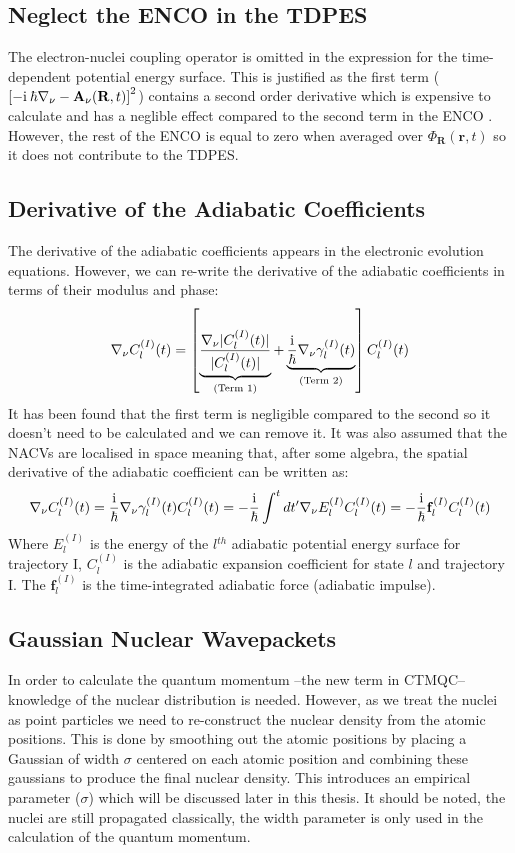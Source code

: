 \subsection{Neglect the ENCO in the TDPES}
The electron-nuclei coupling operator is omitted in the expression for the time-dependent potential energy surface. This is justified as the first term ($\left[-\mathrm{i} \: \hbar \nabla_{\nu} - \mathbf{A}_{\nu}(\mathbf{R}, t) \right]^2$) contains a second order derivative which is expensive to calculate and has a neglible effect compared to the second term in the ENCO \cite{Scherrer2015Aug}. However, the rest of the ENCO is equal to zero when averaged over $\Phi_{\mathbf{R}}(\mathbf{r},t)$ so it does not contribute to the TDPES.
\subsection{Derivative of the Adiabatic Coefficients}
The derivative of the adiabatic coefficients appears in the electronic evolution equations. However, we can re-write the derivative of the adiabatic coefficients in terms of their modulus and phase:
\begin{equation}
	\nabla_{\nu} C_{l}^{(I)}(t) = \left[ \underbrace{\frac{\nabla_{\nu} |C_{l}^{(I)}(t)|}{|C_{l}^{(I)}(t)|}}_{(\text{Term 1})} + \underbrace{\frac{\mathrm{i}}{\hbar} \nabla_{\nu} \gamma_{l}^{(I)}(t)}_{(\text{Term 2})}\right] C_{l}^{(I)}(t)
\end{equation}
It has been found that the first term is negligible compared to the second \cite{abedi_dynamical_2013, agostini_mixed_2013, agostini_exact_2015} so it doesn't need to be calculated and we can remove it. It was also assumed that the NACVs are localised in space meaning that, after some algebra, the spatial derivative of the adiabatic coefficient can be written as:
\begin{equation}
	\nabla_{\nu} C_{l}^{(I)}(t) = \frac{\mathrm{i}}{\hbar} \nabla_{\nu} \gamma_{l}^{(I)}(t) C_{l}^{(I)}(t) = -\frac{\mathrm{i}}{\hbar} \int^{t} dt' \nabla_{\nu} E_{l}^{(I)} C_{l}^{(I)}(t) = -\frac{\mathrm{i}}{\hbar} \mathbf{f}_{l}^{(I)} C_{l}^{(I)}(t)
  \label{eq:hist_force}
\end{equation}
Where $E_{l}^{(I)}$ is the energy of the $l$$^{th}$ adiabatic potential energy surface for trajectory I, $C_{l}^{(I)}$ is the adiabatic expansion coefficient for state $l$ and trajectory I. The $\mathbf{f}_{l}^{(I)}$ is the time-integrated adiabatic force (adiabatic impulse).
\subsection{Gaussian Nuclear Wavepackets}
In order to calculate the quantum momentum --the new term in CTMQC-- knowledge of the nuclear distribution is needed. However, as we treat the nuclei as point particles we need to re-construct the nuclear density from the atomic positions. This is done by smoothing out the atomic positions by placing a Gaussian of width $\sigma$ centered on each atomic position and combining these gaussians to produce the final nuclear density. This introduces an empirical parameter ($\sigma$) which will be discussed later in this thesis. It should be noted, the nuclei are still propagated classically, the width parameter is only used in the calculation of the quantum momentum.
